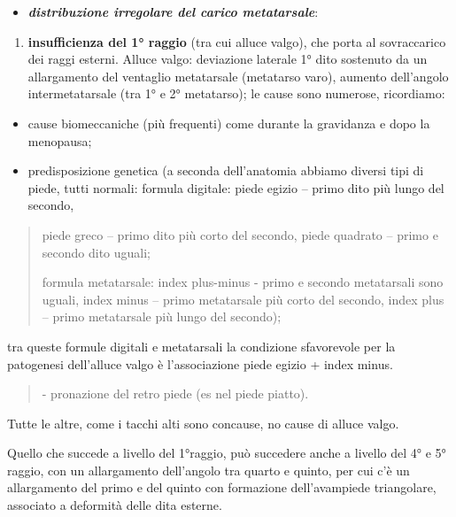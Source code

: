 \documentclass[]{article}
\begin{document}
\begin{itemize}
\item
  \textbf{\emph{distribuzione irregolare del carico metatarsale}}:
\end{itemize}

\begin{enumerate}
\def\labelenumi{\alph{enumi}.}
\item
  \textbf{insufficienza del 1° raggio} (tra cui alluce valgo), che porta
  al sovraccarico dei raggi esterni. Alluce valgo: deviazione laterale
  1° dito sostenuto da un allargamento del ventaglio metatarsale
  (metatarso varo), aumento dell'angolo intermetatarsale (tra 1° e 2°
  metatarso); le cause sono numerose, ricordiamo:
\end{enumerate}

\begin{itemize}
\item
  cause biomeccaniche (più frequenti) come durante la gravidanza e dopo
  la menopausa;
\item
  predisposizione genetica (a seconda dell'anatomia abbiamo diversi tipi
  di piede, tutti normali: formula digitale: piede egizio -- primo dito
  più lungo del secondo,
\end{itemize}

\begin{quote}
piede greco -- primo dito più corto del secondo, piede quadrato -- primo
e secondo dito uguali;

formula metatarsale: index plus-minus - primo e secondo metatarsali sono
uguali, index minus -- primo metatarsale più corto del secondo, index
plus -- primo metatarsale più lungo del secondo);
\end{quote}

tra queste formule digitali e metatarsali la condizione sfavorevole per
la patogenesi dell'alluce valgo è l'associazione piede egizio + index
minus.

\begin{quote}
- pronazione del retro piede (es nel piede piatto).
\end{quote}

Tutte le altre, come i tacchi alti sono concause, no cause di alluce
valgo.

Quello che succede a livello del 1°raggio, può succedere anche a livello
del 4° e 5° raggio, con un allargamento dell'angolo tra quarto e quinto,
per cui c'è un allargamento del primo e del quinto con formazione
dell'avampiede triangolare, associato a deformità delle dita esterne.
\end{document}
